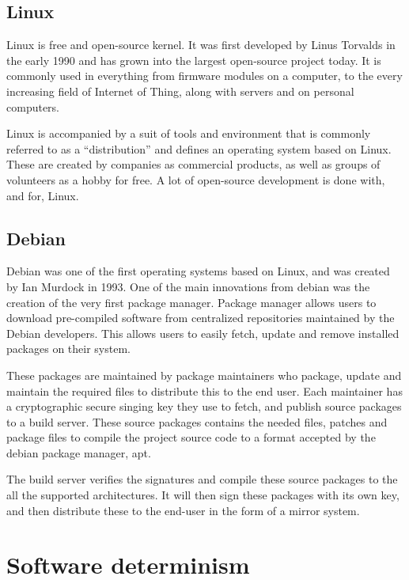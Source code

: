 \documentclass[../Main/thesis.tex]{subfiles}
\begin{document}
\subsection*{Linux}
Linux is free and open-source kernel. It was first developed by Linus Torvalds
in the early 1990 and has grown into the largest open-source project today. It
is commonly used in everything from firmware modules on a computer, to the every
increasing field of Internet of Thing, along with servers and on personal
computers.

Linux is accompanied by a suit of tools and environment that is commonly
referred to as a ``distribution'' and defines an operating system based on
Linux. These are created by companies as commercial products, as well as groups
of volunteers as a hobby for free. A lot of open-source development is done
with, and for, Linux.

\subsection*{Debian}
Debian was one of the first operating systems based on Linux, and was created by
Ian Murdock in 1993. One of the main innovations from debian was the creation of
the very first package manager. Package manager allows users to download
pre-compiled software from centralized repositories maintained by the Debian
developers. This allows users to easily fetch, update and remove installed
packages on their system.

These packages are maintained by package maintainers who package, update and
maintain the required files to distribute this to the end user. Each maintainer
has a cryptographic secure singing key they use to fetch, and publish source
packages to a build server. These source packages contains the needed files,
patches and package files to compile the project source code to a format
accepted by the debian package manager, apt.

The build server verifies the signatures and compile these source packages to
the all the supported architectures. It will then sign these packages with its
own key, and then distribute these to the end-user in the form of a mirror
system.


\section{Software determinism}\label{sec:reproducible_builds}
\end{document}
